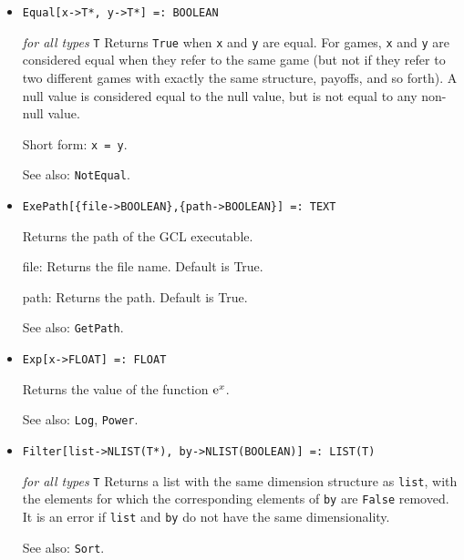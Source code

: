 \begin{itemize}
\item{}
\protect \large \begin{verbatim}
Equal[x->T*, y->T*] =: BOOLEAN
\end{verbatim}\normalsize

{\it for all types} {\tt T}
\bd
Returns \verb+True+ when \verb+x+ and \verb+y+ are equal.  For games,
\verb+x+ and \verb+y+ are considered equal when they refer to the same
game (but not if they refer to two different games with exactly the
same structure, payoffs, and so forth).  A null value is considered equal
to the null value, but is not equal to any non-null value.
\item
[Short form:] \verb+x = y+.
\item
[See also:] \verb+NotEqual+.
\ed

\item{}
\protect \large \begin{verbatim}
ExePath[{file->BOOLEAN},{path->BOOLEAN}] =: TEXT 
\end{verbatim} \normalsize

\bd
Returns the path of the GCL executable. 
\bd
\item [file:] Returns the file name.  Default is True.  
\item [path:] Returns the path.  Default is True. 
\ed
\item [See also:] \verb+GetPath+.
\ed

\item{}
\protect \large \begin{verbatim}
Exp[x->FLOAT] =: FLOAT
\end{verbatim} \normalsize

\bd
Returns the value of the function ${\rm e}^{x}$.
\item [See also:] \verb+Log+, \verb+Power+.
\ed



\item{}
\protect \large \begin{verbatim}
Filter[list->NLIST(T*), by->NLIST(BOOLEAN)] =: LIST(T)
\end{verbatim} \normalsize

{\it for all types} {\tt T}
\bd
Returns a list with the same dimension structure as \verb+list+, with the
elements for which the corresponding elements of \verb+by+ are \verb+False+
removed.  It is an error if \verb+list+ and \verb+by+ do not have the same
dimensionality.
\item [See also:] \verb+Sort+.
\ed


\end{itemize}
